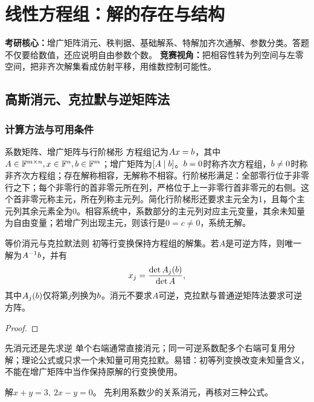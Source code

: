 \chapter{线性方程组：解的存在与结构}\label{ch:systems}
\begin{examtip}
\textbf{考研核心：}增广矩阵消元、秩判据、基础解系、特解加齐次通解、参数分类。答题不仅要给数值，还应说明自由参数个数。
\textbf{竞赛视角：}把相容性转为列空间与左零空间，把非齐次解集看成仿射平移，用维数控制可能性。
\end{examtip}
\section{高斯消元、克拉默与逆矩阵法}
\subsection{计算方法与可用条件}
\begin{definition}{系数矩阵、增广矩阵与行阶梯形}
方程组记为$Ax=b$，其中$A\in\mathbb{F}^{m\times n},x\in\mathbb{F}^n,b\in\mathbb{F}^m$；增广矩阵为$[A\mid b]$。$b=0$时称齐次方程组，$b\ne0$时称非齐次方程组；存在解称相容，无解称不相容。行阶梯形满足：全部零行位于非零行之下；每个非零行的首非零元所在列，严格位于上一非零行首非零元的右侧。这个首非零元称主元，所在列称主元列。简化行阶梯形还要求主元全为1，且每个主元列其余元素全为0。相容系统中，系数部分的主元列对应主元变量，其余未知量为自由变量；若增广列出现主元，则该行是$0=c\ne0$，系统无解。
\end{definition}
\begin{theorem}{等价消元与克拉默法则}
初等行变换保持方程组的解集。若$A$是可逆方阵，则唯一解为$A^{-1}b$，并有
\begin{equation}x_j=\dfrac{\det A_j(b)}{\det A},\label{eq:cramer}\end{equation}
其中$A_j(b)$仅将第$j$列换为$b$。消元不要求$A$可逆，克拉默与普通逆矩阵法要求可逆方阵。
\end{theorem}
\begin{proof}

\end{proof}
\begin{method}{先消元还是先求逆}
单个右端通常直接消元；同一可逆系数配多个右端可复用分解；理论公式或只求一个未知量可用克拉默。易错：初等列变换改变未知量含义，不能在增广矩阵中当作保持原解的行变换使用。
\end{method}
{解$x+y=3,\ 2x-y=0$。}
{先利用系数少的关系消元，再核对三种公式。}
